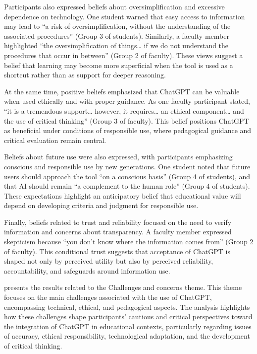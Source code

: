 \documentclass[english]{textolivre}
\begin{document}
Participants also expressed beliefs about oversimplification and excessive dependence on technology. One student warned that easy access to information may lead to “a risk of oversimplification, without the understanding of the associated procedures” (Group 3 of students). Similarly, a faculty member highlighted “the oversimplification of things… if we do not understand the procedures that occur in between” (Group 2 of faculty). These views suggest a belief that learning may become more superficial when the tool is used as a shortcut rather than as support for deeper reasoning.

At the same time, positive beliefs emphasized that ChatGPT can be valuable when used ethically and with proper guidance. As one faculty participant stated, “it is a tremendous support… however, it requires… an ethical component… and the use of critical thinking” (Group 3 of faculty). This belief positions ChatGPT as beneficial under conditions of responsible use, where pedagogical guidance and critical evaluation remain central.

Beliefs about future use were also expressed, with participants emphasizing conscious and responsible use by new generations. One student noted that future users should approach the tool “on a conscious basis” (Group 4 of students), and that AI should remain “a complement to the human role” (Group 4 of students). These expectations highlight an anticipatory belief that educational value will depend on developing criteria and judgment for responsible use.

Finally, beliefs related to trust and reliability focused on the need to verify information and concerns about transparency. A faculty member expressed skepticism because “you don’t know where the information comes from” (Group 2 of faculty). This conditional trust suggests that acceptance of ChatGPT is shaped not only by perceived utility but also by perceived reliability, accountability, and safeguards around information use.

 presents the results related to the Challenges and concerns theme. This theme focuses on the main challenges associated with the use of ChatGPT, encompassing technical, ethical, and pedagogical aspects. The analysis highlights how these challenges shape participants’ cautious and critical perspectives toward the integration of ChatGPT in educational contexts, particularly regarding issues of accuracy, ethical responsibility, technological adaptation, and the development of critical thinking.
\end{document}
